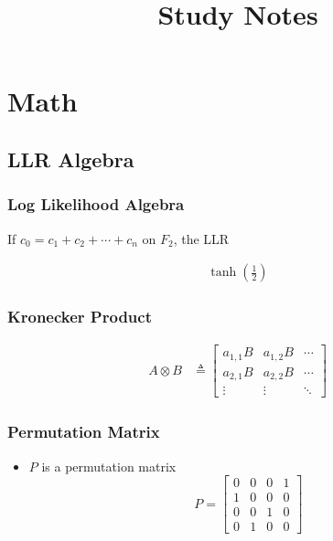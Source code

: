 \documentclass{beamer}
\title{Study Notes}
\begin{document}
\begin{frame}
\titlepage
\end{frame}

\begin{frame}
	\tableofcontents
\end{frame}

\section{Math}

\subsection{LLR Algebra}
\begin{frame}
\frametitle{Log Likelihood Algebra}
If $c_0 = c_1 + c_2 + \cdots + c_n$ on $F_2$, the LLR 


  \begin{align*}
  \tanh(\frac{1}{2})
  \end{align*}


\end{frame}


%
%

\begin{frame}
\frametitle{Kronecker Product}
\begin{align*}
  A \otimes B &\triangleq
  \begin{bmatrix}
   a_{1,1}B & a_{1,2}B & \cdots \\
   a_{2,1}B & a_{2,2}B & \cdots \\
   \vdots   & \vdots   & \ddots
  \end{bmatrix}
\end{align*}
\end{frame}


\begin{frame}
\frametitle{Permutation Matrix}
\begin{itemize}
  \item $P$ is a permutation matrix
    \[
    	P = 
          \begin{bmatrix}
            0 & 0 & 0 & 1 \\
            1 & 0 & 0 & 0 \\
            0 & 0 & 1 & 0 \\
            0 & 1 & 0 & 0
          \end{bmatrix}
    \]
\end{itemize}




\end{frame}
\end{document}
